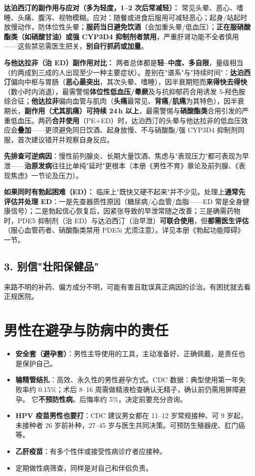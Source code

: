 \documentclass[12pt,UTF8,openany]{ctexbook}
\begin{document}
\textbf{达泊西汀的副作用与应对（多为轻度，1--2 次后常减轻）：} 常见头晕、恶心、嗜睡、头痛、腹泻、视物模糊。应对：随餐或进食后服用可减轻恶心；起身/站起时放慢动作，防体位性头晕；\textbf{服药当日避免饮酒}（会加重头晕/低血压）；\textbf{正在服硝酸酯类（如硝酸甘油）或强 CYP3D4 抑制剂者禁用}，严重肝肾功能不全者慎用——这些禁忌需医生把关，\textbf{别自行抓药或加量}。

\textbf{与他达拉非（治 ED）副作用对比：} 两者总体都是\textbf{轻--中度、多自限}，量级相当（约两成到三成的人出现至少一种主要症状）。差别在"谱系"与"持续时间"：\textbf{达泊西汀}偏向中枢与胃肠（\textbf{恶心最突出}，其次头晕、嗜睡），因半衰期短而\textbf{来得快去得快}（数小时内消退），最需警惕\textbf{体位性低血压/晕厥}及与抗抑郁药合用诱发 5-羟色胺综合征；\textbf{他达拉非}偏向血管与肌肉（\textbf{头痛}最常见、\textbf{背痛/肌痛}为其特色），因半衰期长，\textbf{副作用（尤其肌痛）可持续 24\,h 以上}，最需警惕与\textbf{硝酸酯类}合用引发的严重低血压。两药\textbf{合并使用}（PE+ED）时，达泊西汀的头晕与他达拉非的低血压效应会\textbf{叠加}——更须避免同日饮酒、起身放慢、不与硝酸酯/强 CYP3D4 抑制剂同服，首次建议错开并观察自身反应。

\textbf{先排查可逆病因}：慢性前列腺炎、长期大量饮酒、焦虑与"表现压力"都可表现为早泄——\textbf{治原发病}往往比单纯"延时"更根本（本册《男性不育》章论及前列腺、《表现焦虑》一节论及压力）。

\textbf{如果同时有勃起困难（ED）：} 临床上"既快又硬不起来"并不少见。处理上\textbf{通常先评估并处理 ED}：一是先查器质性原因（糖尿病/心血管/血脂——ED 常是全身健康信号）；二是勃起信心恢复后，因紧张导致的早泄常随之改善；三是确需药物时，PDE5 抑制剂（治 ED）与达泊西汀（治早泄）\textbf{可联合使用}，但\textbf{都需医生评估}（服心血管药者、硝酸酯类禁用 PDE5i 尤须注意）。详见本册《勃起功能障碍》一节。

\subsection*{3. 别信"壮阳保健品"}

来路不明的补药、偏方成分不明，可能有害且耽误真正病因的诊治。有困扰就去看正规医院。

\section{男性在避孕与防病中的责任}

\begin{itemize}[leftmargin=2em]
  \item \textbf{安全套（避孕套）}：男性主导使用的工具，主动准备好、正确佩戴，是责任也是保护自己。
  \item \textbf{输精管结扎}：高效、永久性的男性避孕方式。CDC 数据：典型使用第一年失败率约
        0.15\%；术后 8--16 周需做精液检查确认无精子，确认前仍需用屏障避孕。
        它\textbf{不预防性病}。后悔率约 5\%，决定前要充分咨询。
  \item \textbf{HPV 疫苗男性也要打}：CDC 建议男女都在 11--12 岁常规接种、可 9 岁起，
        未接种者 26 岁前补种，27--45 岁与医生共同决策。可预防生殖器疣、肛门癌等。
  \item \textbf{乙肝疫苗}：有多个性伴或接受性病诊疗者应接种。
  \item 定期做性病筛查，同样是对自己和伴侣负责。
\end{itemize}
\end{document}
